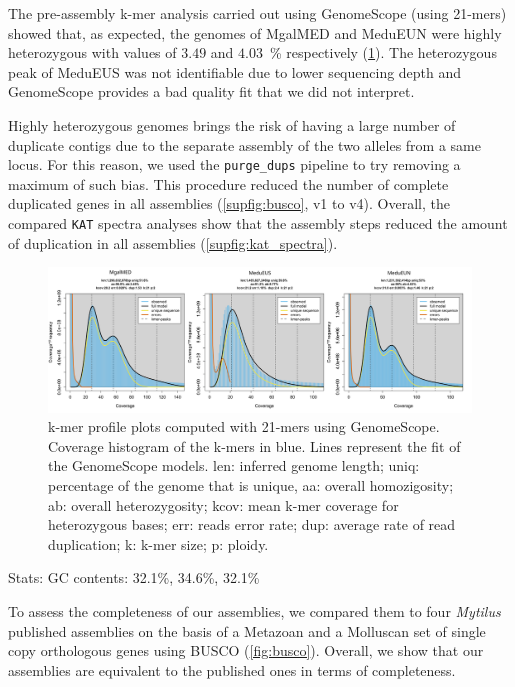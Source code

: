\documentclass[11pt, a4paper]{article}
\begin{document}
The pre-assembly k-mer analysis carried out using GenomeScope (using 21-mers) showed that, as expected, the genomes of MgalMED and MeduEUN were highly heterozygous with values of $3.49$ and $4.03$~\% respectively (\cref{fig:genomescope}).
The heterozygous peak of MeduEUS was not identifiable due to lower sequencing depth and GenomeScope provides a bad quality fit that we did not interpret.

Highly heterozygous genomes brings the risk of having a large number of duplicate contigs due to the separate assembly of the two alleles from a same locus.
For this reason, we used the \texttt{purge\_dups} pipeline to try removing a maximum of such bias.
This procedure reduced the number of complete duplicated genes in all assemblies (\cref{supfig:busco}, v1 to v4).
Overall, the compared \texttt{KAT} spectra analyses show that the assembly steps reduced the amount of duplication in all assemblies (\cref{supfig:kat_spectra}).

\begin{figure}[h]
	\includegraphics[width=\linewidth]{figures/Fig1_genomescope.pdf}
	\caption{k-mer profile plots computed with 21-mers using GenomeScope.
		Coverage histogram of the k-mers in blue.
		Lines represent the fit of the GenomeScope models.
		len: inferred genome length; uniq: percentage of the genome that is unique, aa: overall homozigosity; ab: overall heterozygosity; kcov: mean k-mer coverage for heterozygous bases; err: reads error rate; dup: average rate of read duplication; k: k-mer size; p: ploidy.
	}
	\label{fig:genomescope}
\end{figure}

Stats:
GC contents: 32.1\%, 34.6\%, 32.1\%


\begin{landscape}
	
\end{landscape}


To assess the completeness of our assemblies, we compared them to four \textit{Mytilus} published assemblies on the basis of a Metazoan and a Molluscan set of single copy orthologous genes using BUSCO (\cref{fig:busco}).
Overall, we show that our assemblies are equivalent to the published ones in terms of completeness.
\end{document}
